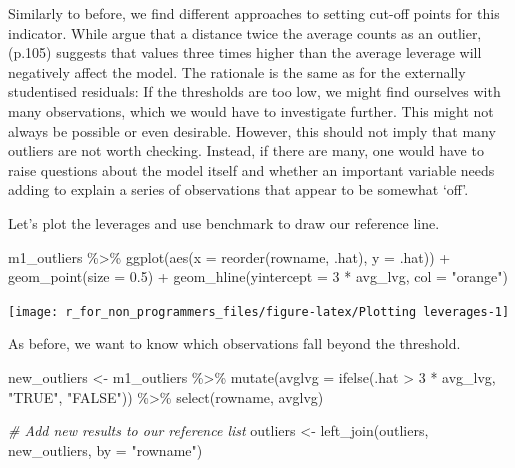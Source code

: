 \documentclass[
]{book}
\newenvironment{Shaded}{\begin{snugshade}}{\end{snugshade}}
\newcommand{\AttributeTok}[1]{\textcolor[rgb]{0.77,0.63,0.00}{#1}}
\newcommand{\CommentTok}[1]{\textcolor[rgb]{0.56,0.35,0.01}{\textit{#1}}}
\newcommand{\DecValTok}[1]{\textcolor[rgb]{0.00,0.00,0.81}{#1}}
\newcommand{\FloatTok}[1]{\textcolor[rgb]{0.00,0.00,0.81}{#1}}
\newcommand{\FunctionTok}[1]{\textcolor[rgb]{0.00,0.00,0.00}{#1}}
\newcommand{\NormalTok}[1]{#1}
\newcommand{\OtherTok}[1]{\textcolor[rgb]{0.56,0.35,0.01}{#1}}
\newcommand{\SpecialCharTok}[1]{\textcolor[rgb]{0.00,0.00,0.00}{#1}}
\newcommand{\StringTok}[1]{\textcolor[rgb]{0.31,0.60,0.02}{#1}}
\begin{document}
Similarly to before, we find different approaches to setting cut-off points for this indicator. While \citet{hoaglin1978hat} argue that a distance twice the average counts as an outlier, \citet{stevens2012applied} (p.105) suggests that values three times higher than the average leverage will negatively affect the model. The rationale is the same as for the externally studentised residuals: If the thresholds are too low, we might find ourselves with many observations, which we would have to investigate further. This might not always be possible or even desirable. However, this should not imply that many outliers are not worth checking. Instead, if there are many, one would have to raise questions about the model itself and whether an important variable needs adding to explain a series of observations that appear to be somewhat `off'.

Let's plot the leverages and use \citet{stevens2012applied} benchmark to draw our reference line.

\begin{Shaded}
\begin{Highlighting}[]
\NormalTok{m1\_outliers }\SpecialCharTok{\%\textgreater{}\%}
  \FunctionTok{ggplot}\NormalTok{(}\FunctionTok{aes}\NormalTok{(}\AttributeTok{x =} \FunctionTok{reorder}\NormalTok{(rowname, .hat),}
             \AttributeTok{y =}\NormalTok{ .hat)) }\SpecialCharTok{+}
  \FunctionTok{geom\_point}\NormalTok{(}\AttributeTok{size =} \FloatTok{0.5}\NormalTok{) }\SpecialCharTok{+}
  \FunctionTok{geom\_hline}\NormalTok{(}\AttributeTok{yintercept =} \DecValTok{3} \SpecialCharTok{*}\NormalTok{ avg\_lvg, }\AttributeTok{col =} \StringTok{"orange"}\NormalTok{)}
\end{Highlighting}
\end{Shaded}

\begin{center}\texttt{[image: r\_for\_non\_programmers\_files/figure-latex/Plotting leverages-1]} \end{center}

As before, we want to know which observations fall beyond the threshold.

\begin{Shaded}
\begin{Highlighting}[]
\NormalTok{new\_outliers }\OtherTok{\textless{}{-}}\NormalTok{ m1\_outliers }\SpecialCharTok{\%\textgreater{}\%}
  \FunctionTok{mutate}\NormalTok{(}\AttributeTok{avglvg =} \FunctionTok{ifelse}\NormalTok{(.hat }\SpecialCharTok{\textgreater{}} \DecValTok{3} \SpecialCharTok{*}\NormalTok{ avg\_lvg, }\StringTok{"TRUE"}\NormalTok{, }\StringTok{"FALSE"}\NormalTok{)) }\SpecialCharTok{\%\textgreater{}\%}
  \FunctionTok{select}\NormalTok{(rowname, avglvg)}

\CommentTok{\# Add new results to our reference list}
\NormalTok{outliers }\OtherTok{\textless{}{-}} \FunctionTok{left\_join}\NormalTok{(outliers, new\_outliers, }\AttributeTok{by =} \StringTok{"rowname"}\NormalTok{)}
\end{Highlighting}
\end{Shaded}
\end{document}
